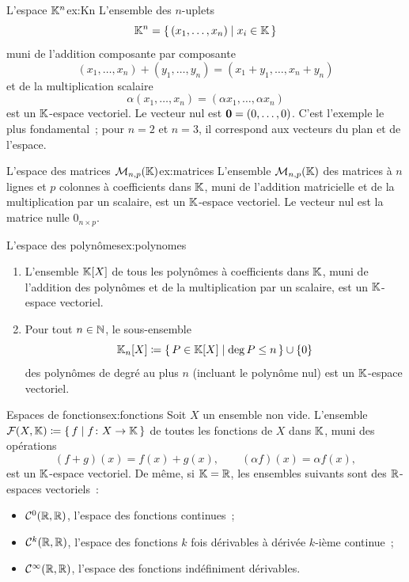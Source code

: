 \begin{example}{L'espace ${\mathbb{K}}^n$}{ex:Kn}
  L'ensemble des $n$-uplets
  \[
    {\mathbb{K}}^n = \left\{\,(x_1,\ldots,x_n)\;\middle|\;x_i\in{\mathbb{K}}\,\right\}
  \]
  muni de l'addition composante par composante
  \[
    (x_1,\ldots,x_n)+(y_1,\ldots,y_n) = (x_1+y_1,\ldots,x_n+y_n)
  \]
  et de la multiplication scalaire
  \[
    \alpha(x_1,\ldots,x_n) = (\alpha x_1,\ldots,\alpha x_n)
  \]
  est un ${\mathbb{K}}$-espace vectoriel. Le vecteur nul est
  $\mathbf{0}=(0,\ldots,0)$. C'est l'exemple le plus fondamental~; pour
  $n=2$ et $n=3$, il correspond aux vecteurs du plan et de l'espace.
\end{example}

\begin{example}{L'espace des matrices $\mathcal{M}_{n,p}({\mathbb{K}})$}{ex:matrices}
  L'ensemble $\mathcal{M}_{n,p}({\mathbb{K}})$ des matrices à $n$ lignes et $p$ colonnes
  à coefficients dans ${\mathbb{K}}$, muni de l'addition matricielle et de la
  multiplication par un scalaire, est un ${\mathbb{K}}$-espace vectoriel. Le
  vecteur nul est la matrice nulle $0_{n\times p}$.
\end{example}

\begin{example}{L'espace des polynômes}{ex:polynomes}
  \begin{enumerate}[label=(\alph*)]
    \item L'ensemble ${\mathbb{K}}[X]$ de tous les polynômes à coefficients dans ${\mathbb{K}}$,
      muni de l'addition des polynômes et de la multiplication par un
      scalaire, est un ${\mathbb{K}}$-espace vectoriel.
    \item Pour tout $n\in{\mathbb{N}}$, le sous-ensemble
      \[
        {\mathbb{K}}_n[X] \coloneqq \left\{\,P\in{\mathbb{K}}[X]\;\middle|\;\deg P\leq n\,\right\}\cup\left\{0\right\}
      \]
      des polynômes de degré au plus $n$ (incluant le polynôme nul) est
      un ${\mathbb{K}}$-espace vectoriel.
  \end{enumerate}
\end{example}

\begin{example}{Espaces de fonctions}{ex:fonctions}
  Soit $X$ un ensemble non vide. L'ensemble
  ${\mathcal{F}}(X,{\mathbb{K}}) \coloneqq \left\{\,f\;\middle|\;f\colon X\to{\mathbb{K}}\,\right\}$ de toutes les
  fonctions de $X$ dans ${\mathbb{K}}$, muni des opérations
  \[
    (f+g)(x)=f(x)+g(x), \qquad (\alpha f)(x) = \alpha f(x),
  \]
  est un ${\mathbb{K}}$-espace vectoriel. De même, si ${\mathbb{K}}={\mathbb{R}}$, les ensembles
  suivants sont des ${\mathbb{R}}$-espaces vectoriels~:
  \begin{itemize}
    \item ${\mathcal{C}}^0({\mathbb{R}},{\mathbb{R}})$, l'espace des fonctions continues~;
    \item ${\mathcal{C}}^k({\mathbb{R}},{\mathbb{R}})$, l'espace des fonctions $k$ fois dérivables
      à dérivée $k$-ième continue~;
    \item ${\mathcal{C}}^\infty({\mathbb{R}},{\mathbb{R}})$, l'espace des fonctions indéfiniment
      dérivables.
  \end{itemize}
\end{example}

